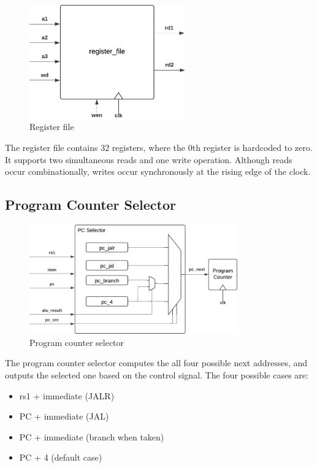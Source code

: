 \begin{figure}[H]
    \centering
    \includegraphics[width=0.6\textwidth]{media/register_file}
    \caption{Register file}
    \label{fig:regfile}
\end{figure}

The register file contains 32 registers, where the 0th register is hardcoded to zero.
It supports two simultaneous reads and one write operation.
Although reads occur combinationally, writes occur synchronously at the rising edge of the clock.

\subsection{Program Counter Selector}

\begin{figure}[H]
    \centering
    \includegraphics[width=0.8\textwidth]{media/pc_selector}
    \caption{Program counter selector}
    \label{fig:pcselector}
\end{figure}

The program counter selector computes the all four possible next addresses, and outputs the selected one based on the control signal.
The four possible cases are:
\begin{itemize}
    \item rs1 + immediate (JALR)
    \item PC + immediate (JAL)
    \item PC + immediate (branch when taken)
    \item PC + 4 (default case)
\end{itemize}